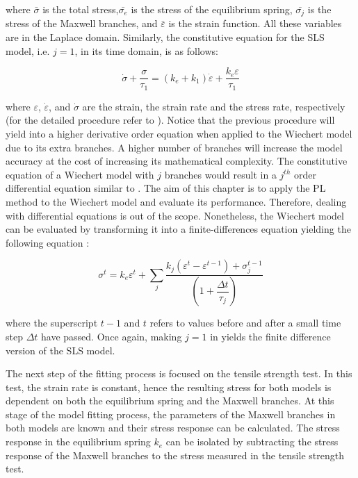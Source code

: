 \noindent where $\bar{\sigma}$ is the total stress,$ \bar{\sigma_e}$ is the stress of the equilibrium spring, $\bar{\sigma_j}$ is the stress of the Maxwell branches, and $\bar{\varepsilon}$ is the strain function. All these variables are in the Laplace domain.  Similarly, the constitutive equation for the SLS model, i.e. $j=1$, in its time domain, is as follows:

\begin{equation}
\label{eq3}
\dot{\sigma} + \frac{\sigma}{\tau_1} =  (k_e + k_1)\dot{\varepsilon} + \frac{k_e\varepsilon}{\tau_1}
\end{equation}

\noindent where $\varepsilon$, $\dot{\varepsilon}$, and $\dot{\sigma}$ are the strain, the strain rate and the stress rate, respectively (for the detailed procedure refer to \cite{roylance2001engineering}). Notice that the previous procedure will yield into a higher derivative order equation when applied to the Wiechert model due to its extra branches. A higher number of branches will increase the model accuracy at the cost of increasing its mathematical complexity. The constitutive equation of a Wiechert model with $j$ branches would result in a $j^{th}$ order differential equation similar to . The aim of this chapter is to apply the PL method to the Wiechert model and evaluate its performance. Therefore, dealing with differential equations is out of the scope. Nonetheless, the Wiechert model can be evaluated by transforming it into a finite-differences equation yielding the following equation \cite{roylance2001engineering}:

\begin{equation}
    \label{eq4}
    \sigma^t = k_e\varepsilon^t + \sum_j \frac{k_j(\varepsilon^t - \varepsilon^{t-1}) + \sigma_j^{t-1}}{ \left( 1+\dfrac{\Delta t}{\tau_j} \right) }
\end{equation}

\noindent where the superscript $t-1$ and $t$ refers to values before and after a small time step $\Delta t$ have passed. Once again, making $j=1$ in  yields the finite difference version of the SLS model. 

The next step of the fitting process is focused on the tensile strength test. In this test, the strain rate is constant, hence the resulting stress for both models is dependent on both the equilibrium spring and the Maxwell branches. At this stage of the model fitting process, the parameters of the Maxwell branches in both models are known and their stress response can be calculated. The stress response in the equilibrium spring $k_e$ can be isolated by subtracting the stress response of the Maxwell branches to the stress measured in the tensile strength test. 

